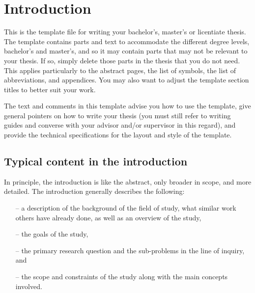 \documentclass[english, 12pt, a4paper, elec, utf8, a-2b, online]{aaltothesis}
\begin{document}
\cleardoublepage

\section{Introduction}
\label{sec:intro}

\thispagestyle{empty}

This is the template file for writing your bachelor’s, master’s or licentiate 
thesis. The template contains parts and text to accommodate the different degree 
levels, bachelor’s and master’s, and so it may contain parts that may not be 
relevant to your thesis. If so, simply delete those parts in the thesis that you
do not need. This applies particularly to the abstract pages, the list of
symbols, the list of abbreviations, and appendices. You may also want to adjust
the template section titles to better suit your work.

The text and comments in this template advise you how to use the template, give 
general pointers on how to write your thesis (you must still refer to writing
guides and converse with your advisor and/or supervisor in this regard), and
provide the technical specifications for the layout and style of the template.

\subsection{Typical content in the introduction}

In principle, the introduction is like the abstract, only broader in scope, and
more detailed. The introduction generally describes the following:

\begin{itemize}
	\item[--] a description of the background of the field of study, what
	similar work others have already done, as well as an overview of the study,
	\item[--] the goals of the study,
	\item[--] the primary research question and the sub-problems in the line
	of inquiry, and
	\item[--] the scope and constraints of the study along with the main
	concepts involved.
\end{itemize}
\end{document}
